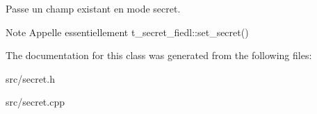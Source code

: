 Passe un champ existant en mode \textquotesingle{}secret\textquotesingle{}. 

\begin{DoxyNote}{Note}
Appelle essentiellement t\+\_\+secret\+\_\+fiedl\+::set\+\_\+secret() 
\end{DoxyNote}


The documentation for this class was generated from the following files\+:\begin{DoxyCompactItemize}
\item 
src/secret.\+h\item 
src/secret.\+cpp\end{DoxyCompactItemize}
